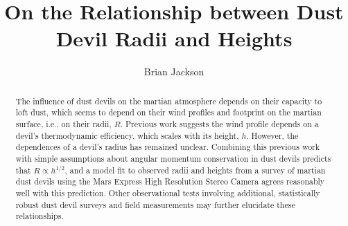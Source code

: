 \documentclass{aastex63}
\begin{document}
\title{On the Relationship between Dust Devil Radii and Heights}


\author[0000-0002-9495-9700]{Brian Jackson}



\begin{abstract}
The influence of dust devils on the martian atmosphere depends on their capacity to loft dust, which seems to depend on their wind profiles and footprint on the martian surface, i.e., on their radii, $R$. Previous work suggests the wind profile depends on a devil's thermodynamic efficiency, which scales with its height, $h$. However, the dependences of a devil's radius has remained unclear. Combining this previous work with simple assumptions about angular momentum conservation in dust devils predicts that $R \propto h^{1/2}$, and a model fit to observed radii and heights from a survey of martian dust devils using the Mars Express High Resolution Stereo Camera agrees reasonably well with this prediction. Other observational tests involving additional, statistically robust dust devil surveys and field measurements may further elucidate these relationships.
\end{abstract}

\end{document}
